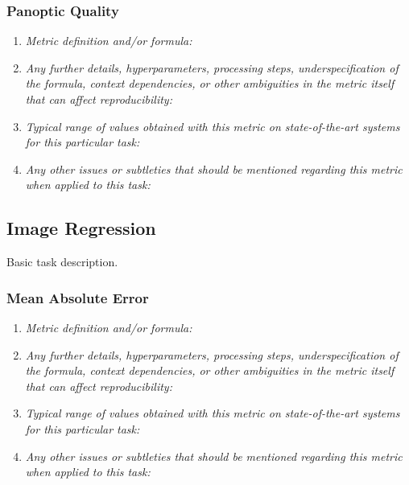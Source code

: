 \documentclass[a4paper,11pt]{article}
\begin{document}
        \subsubsection{Panoptic Quality}
            \begin{enumerate}[label=\alph*.]
                \item \textit{Metric definition and/or formula:}
                \bigskip
                \item \textit{Any further details, hyperparameters, processing steps, underspecification of the formula, context dependencies, or other ambiguities in the metric itself that can affect reproducibility:}
                \bigskip
                \item \textit{Typical range of values obtained with this metric on state-of-the-art systems for this particular task:}
                \bigskip
                \item \textit{Any other issues or subtleties that should be mentioned regarding this metric when applied to this task:}
                \bigskip
            \end{enumerate}

    \subsection{Image Regression}
        Basic task description.
        \subsubsection{Mean Absolute Error}
            \begin{enumerate}[label=\alph*.]
                \item \textit{Metric definition and/or formula:}
                \bigskip
                \item \textit{Any further details, hyperparameters, processing steps, underspecification of the formula, context dependencies, or other ambiguities in the metric itself that can affect reproducibility:}
                \bigskip
                \item \textit{Typical range of values obtained with this metric on state-of-the-art systems for this particular task:}
                \bigskip
                \item \textit{Any other issues or subtleties that should be mentioned regarding this metric when applied to this task:}
                \bigskip
            \end{enumerate}
\end{document}
